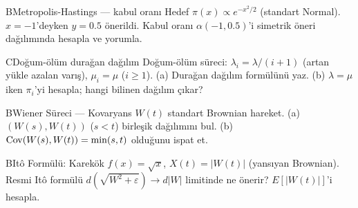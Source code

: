 \begin{alistirma}[Al.10.10]{B}{Metropolis-Hastings --- kabul oranı}
Hedef $\pi(x)\propto e^{-x^2/2}$ (standart Normal). $x=-1$'deyken $y=0.5$ önerildi. Kabul oranı $\alpha(-1,0.5)$'i simetrik öneri dağılımında hesapla ve yorumla.
\end{alistirma}

\begin{alistirma}[Al.10.8]{C}{Doğum-ölüm durağan dağılım}
Doğum-ölüm süreci: $\lambda_i=\lambda/(i+1)$ (artan yükle azalan varış), $\mu_i=\mu$ ($i\geq1$). (a) Durağan dağılım formülünü yaz. (b) $\lambda=\mu$ iken $\pi_i$'yi hesapla; hangi bilinen dağılım çıkar?
\end{alistirma}

\begin{alistirma}[Al.10.11]{B}{Wiener Süreci --- Kovaryans}
$W(t)$ standart Brownian hareket. (a) $(W(s),W(t))$ ($s<t$) birleşik dağılımını bul. (b) $\operatorname{Cov}(W(s),W(t))=\min(s,t)$ olduğunu ispat et.
\end{alistirma}

\begin{alistirma}[Al.10.12]{B}{Itô Formülü: Karekök}
$f(x)=\sqrt{x}$, $X(t)=|W(t)|$ (yansıyan Brownian). Resmi Itô formülü $d(\sqrt{W^2+\varepsilon})\to d|W|$ limitinde ne önerir? $E[|W(t)|]$'i hesapla.
\end{alistirma}

